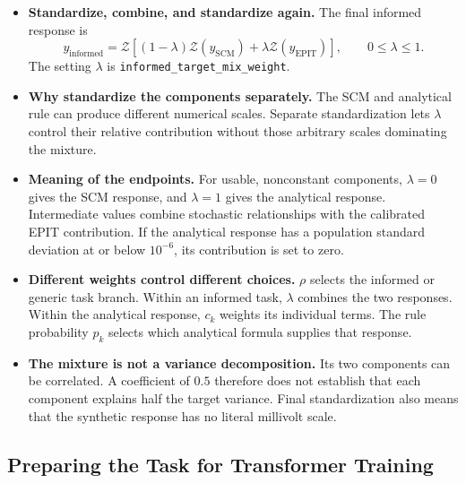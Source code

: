 \documentclass[11pt]{article}
\newenvironment{notes}
  {\begin{itemize}\setlength{\itemsep}{0.45em}\setlength{\parsep}{0pt}}
  {\end{itemize}}
\begin{document}
\begin{notes}
    \item \textbf{Standardize, combine, and standardize again.}
    The final informed response is
    \begin{equation}
        y_{\mathrm{informed}}
        =
        \mathcal{Z}\!\left[
            (1-\lambda)\mathcal{Z}(y_{\mathrm{SCM}})
            +\lambda\mathcal{Z}(y_{\mathrm{EPIT}})
        \right],
        \qquad 0\leq\lambda\leq1.
        \label{eq:scm-epit-target}
    \end{equation}
    The setting \(\lambda\) is
    \texttt{informed\_target\_mix\_weight}.

    \item \textbf{Why standardize the components separately.}
    The SCM and analytical rule can produce different
    numerical scales. Separate standardization lets
    \(\lambda\) control their relative contribution without
    those arbitrary scales dominating the mixture.

    \item \textbf{Meaning of the endpoints.}
    For usable, nonconstant components, \(\lambda=0\) gives
    the SCM response, and \(\lambda=1\) gives the analytical
    response. Intermediate values combine stochastic
    relationships with the calibrated EPIT contribution.
    If the analytical response has a population standard deviation
    at or below \(10^{-6}\), its contribution is set to zero.

    \item \textbf{Different weights control different choices.}
    \(\rho\) selects the informed or generic task branch.
    Within an informed task, \(\lambda\) combines the two
    responses. Within the analytical response, \(c_k\)
    weights its individual terms. The rule probability \(p_k\)
    selects which analytical formula supplies that response.

    \item \textbf{The mixture is not a variance decomposition.}
    Its two components can be correlated. A coefficient of
    \(0.5\) therefore does not establish that each component
    explains half the target variance. Final standardization
    also means that the synthetic response has no literal
    millivolt scale.
\end{notes}

\subsection{Preparing the Task for Transformer Training}
\label{sec:synthetic-task-handoff}
\end{document}
